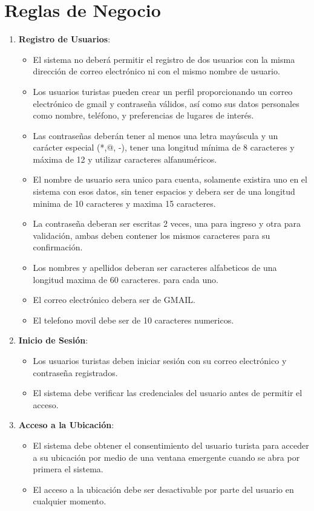 \documentclass{article}
\begin{document}
\section{Reglas de Negocio}
\begin{enumerate}
    \item \textbf{Registro de Usuarios}:
    \begin{itemize}
        \item El sistema no deberá permitir el registro de dos usuarios con la misma dirección de correo electrónico ni con el mismo nombre de usuario.
        \item Los usuarios turistas pueden crear un perfil proporcionando un correo electrónico de gmail y contraseña válidos, así como sus datos personales como nombre, teléfono, y preferencias de lugares de interés.
        \item Las contraseñas deberán tener al menos una letra mayúscula y un carácter especial (*,@, -), tener una longitud mínima de 8 caracteres y máxima de 12 y utilizar caracteres alfanuméricos.
        \item El nombre de usuario sera unico para cuenta, solamente existira uno en el sistema con esos datos, sin tener espacios y debera ser de una longitud minima de 10 caracteres y maxima 15 caracteres.
        \item La contraseña deberan ser escritas 2 veces, una para ingreso y otra para validación, ambas deben contener los mismos caracteres para su confirmación.
        \item Los nombres y apellidos deberan ser caracteres alfabeticos de una longitud maxima de 60 caracteres. para cada uno.
        \item El correo electrónico debera ser de GMAIL.
        \item El telefono movil debe ser de 10 caracteres numericos.
        
    \end{itemize}

    
    \item \textbf{Inicio de Sesión}:
    \begin{itemize}
        \item Los usuarios turistas deben iniciar sesión con su correo electrónico y contraseña registrados.
        \item El sistema debe verificar las credenciales del usuario antes de permitir el acceso.
    \end{itemize}
    
    \item \textbf{Acceso a la Ubicación}:
    \begin{itemize}
        \item El sistema debe obtener el consentimiento del usuario turista para acceder a su ubicación por medio de una ventana emergente cuando se abra por primera el sistema.
        \item El acceso a la ubicación debe ser desactivable por parte del usuario en cualquier momento.
    \end{itemize}
    

\end{enumerate}
\end{document}
